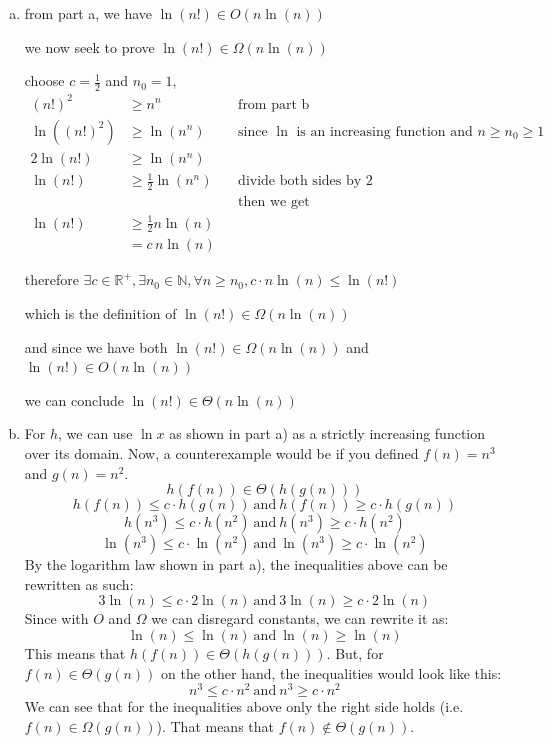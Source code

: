 \documentclass[letterpaper,11pt]{article}
\theoremstyle{plain}
\theoremstyle{definition}
\begin{document}
{\begin{enumerate}[a)]
    \noindent therefore by mathematical induction we have
    \[
    (n!)^2 \ge n^n, \forall n \in \mathbb{N}
    \]
     
    \hfill $\blacksquare$
    \item
    \noindent from part a, we have $\ln(n!) \in O(n \ln(n))$
     
    \noindent we now seek to prove $\ln(n!) \in \Omega(n \ln(n))$
     
    \noindent choose $c = \frac{1}{2}$ and $n_0 = 1$,
    \begin{align*}
    (n!)^2 &\ge n^n && \text{from part b} \\
    \ln((n!)^2) &\ge \ln(n^n) && \text{since } \ln \text{ is an increasing function and } n \ge n_0 \ge 1 \\
    2\ln(n!) &\ge \ln(n^n) \\
    \ln(n!) &\ge \frac{1}{2} \ln(n^n) && \text{divide both sides by } 2 \\
    &&& \text{then we get} \\
    \ln(n!) &\ge \frac{1}{2} n \ln(n) \\
    &= c\, n \ln(n)
    \end{align*}
     
    \noindent therefore $\exists c \in \mathbb{R}^+, \exists n_0 \in \mathbb{N}, \forall n \ge n_0, c \cdot n \ln(n) \le \ln(n!)$
     
    \noindent which is the definition of $\ln(n!) \in \Omega(n \ln(n))$
     
    \bigskip
     
    \noindent and since we have both $\ln(n!) \in \Omega(n \ln(n))$ and $\ln(n!) \in O(n \ln(n))$
     
    \noindent we can conclude $\ln(n!) \in \Theta(n \ln(n))$
 
    \item
    For $h$, we can use $\ln x$ as shown in part a) as a strictly increasing function over its domain. Now, a counterexample would be if you defined $f(n) = n^3$ and $g(n) = n^2$.
    \[h(f(n))\in \Theta(h(g(n)))\]
    \[h(f(n)) \leq c \cdot h(g(n)) ~\text{and} ~h(f(n)) \geq c \cdot h(g(n))\]
    \[h(n^3) \leq c \cdot h(n^2) ~\text{and} ~h(n^3) \geq c \cdot h(n^2)\]
    \[\ln(n^3) \leq c \cdot \ln(n^2) ~\text{and} ~\ln(n^3) \geq c \cdot \ln(n^2)\]
    By the logarithm law shown in part a), the inequalities above can be rewritten as such:
    \[3\ln(n) \leq c \cdot 2\ln(n) ~\text{and} ~3\ln(n) \geq c \cdot 2\ln(n)\]
    Since with $O$ and $\Omega$ we can disregard constants, we can rewrite it as: 
    \[\ln(n) \leq \ln(n) ~\text{and} ~\ln(n) \geq \ln(n)\]
    This means that $h(f(n))\in \Theta(h(g(n)))$. But, for $f(n)\in \Theta(g(n))$ on the other hand, the inequalities would look like this:
    \[n^3 \leq c \cdot n^2 ~\text{and} ~n^3 \geq c \cdot n^2\]
    We can see that for the inequalities above only the right side holds (i.e. $f(n)\in \Omega(g(n))$). That means that $f(n)\notin \Theta(g(n))$.
    \end{enumerate}
}
\end{document}

